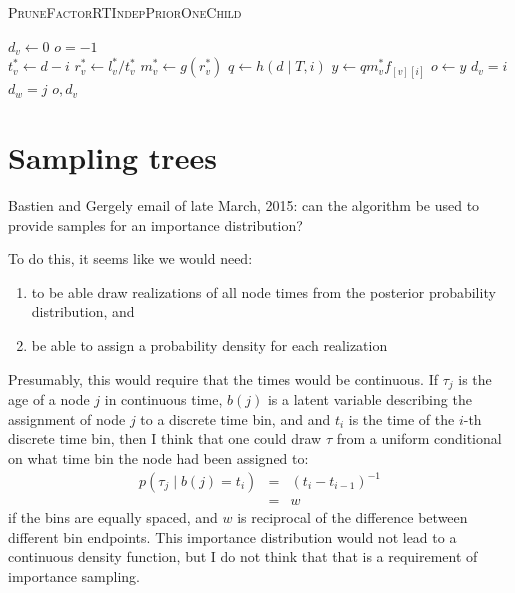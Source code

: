 \documentclass{llncs}
\newcommand{\tree}[0]{\ensuremath{T}\xspace}
\newcommand{\timebin}[0]{\ensuremath{t}\xspace}
\newcommand{\contTime}[0]{\ensuremath{\tau}\xspace}
\newcommand{\binFor}[1]{\ensuremath{b({#1})}\xspace}
\newcommand{\subtreeOptFactor}[2]{\ensuremath{f_{[{#1}][{#2}]}}\xspace}
\newcommand{\ratePriorDensity}[0]{\ensuremath{g}\xspace}
\newcommand{\timePriorDensity}[0]{\ensuremath{h}\xspace}
\begin{document}
\begin{algorithm} \caption{\textsc{PruneFactorRTIndepPriorOneChild}}\label{pruneFactorRTIndepOneChild}
\begin{algorithmic}
\STATE $d_v\leftarrow 0$
\STATE $o = -1$ \\
\FOR{$i \in [0, 1, \ldots, d)$ }
    \STATE $t_v^{\ast} \leftarrow d - i$
    \STATE $r_v^{\ast} \leftarrow l_v^{\ast} / t_v^{\ast}$
    \STATE $m_v^{\ast} \leftarrow \ratePriorDensity(r_v^{\ast})$
    \STATE $q \leftarrow \timePriorDensity(d \mid \tree, i)$
    \STATE $y \leftarrow q m_v^{\ast}\subtreeOptFactor{v}{i}$
        \STATE $o \leftarrow y$
        \STATE $d_v = i$
        \STATE $d_w = j$
    \ENDIF
\ENDFOR
\RETURN $o, d_v$
\end{algorithmic}
\end{algorithm}

\newpage




\section{Sampling trees}
Bastien and Gergely email of late March, 2015: can the 
algorithm be used to provide samples for an importance distribution?

To do this, it seems like we would need:
\begin{enumerate}
    \item to be able draw realizations of all node times from the posterior
        probability distribution, and
    \item be able to assign a probability density for each realization
\end{enumerate}

Presumably, this would require that the times would be continuous.
If $\contTime_j$ is the age of a node $j$ in continuous time,
    $\binFor{j}$ is a latent variable describing the assignment of node
    $j$ to a discrete time bin, and
    and $\timebin_i$ is the time of the $i$-th discrete time bin, then I think that one could
    draw $\contTime$ from a uniform conditional on what time bin the 
    node had been assigned to:
\begin{eqnarray}
    p(\contTime_j \mid \binFor{j} = \timebin_i) & = & \left(\timebin_{i} - \timebin_{i - 1}\right)^{-1}\\
    & = & w
\end{eqnarray}
if the bins are equally spaced, and $w$ is reciprocal of the
difference between different bin endpoints.
This importance distribution would not lead to a continuous density function, but I do
    not think that that is a requirement of importance sampling.
\end{document}
